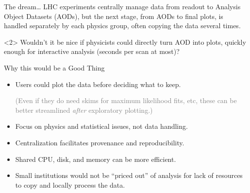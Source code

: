 \documentclass{beamer}
\begin{document}
\begin{frame}{The dream\ldots}
\vspace{0.5 cm}
LHC experiments centrally manage data from readout to Analysis Object Datasets (AODs), but the next stage, from AODs to final plots, is handled separately by each physics group, often copying the data several times.

\vspace{0.2 cm}

\vspace{0.5 cm}
\begin{uncoverenv}<2>
Wouldn't it be nice if physicists could directly turn AOD into plots, quickly enough for interactive analysis (seconds per scan at most)?
\end{uncoverenv}
\end{frame}

\begin{frame}{Why this would be a Good Thing}
\large
\vspace{0.5 cm}
\begin{itemize}\setlength{\itemsep}{0.5 cm}
\item Users could plot the data before deciding what to keep.

\vspace{0.2 cm}
\textcolor{gray}{\normalsize (Even if they do need skims for maximum likelihood fits, etc, these can be better streamlined {\it after} exploratory plotting.)}

\vspace{-0.2 cm}
\item Focus on physics and statistical issues, not data handling.
\item Centralization facilitates provenance and reproducibility.
\item Shared CPU, disk, and memory can be more efficient.
\item Small institutions would not be ``priced out'' of analysis for lack of resources to copy and locally process the data.
\end{itemize}
\end{frame}
\end{document}
